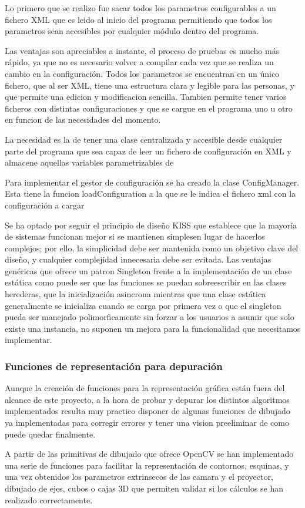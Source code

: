 Lo primero que se realizo fue sacar todos los parametros configurables a un fichero XML que es leido al inicio del programa permitiendo que todos los parametros sean accesibles por cualquier módulo dentro del programa.

Las ventajas son apreciables a instante, el proceso de pruebas es mucho más rápido, ya que no es necesario volver a compilar cada vez que se realiza un cambio en la configuración. Todos los parametros se encuentran en un único fichero, que al ser XML, tiene una estructura clara y legible para las personas, y que permite una edicion y modificacion sencilla. Tambien permite tener varios ficheros con distintas configuraciones y que se cargue en el programa uno u otro en funcion de las necesidades del momento.
 
La necesidad es la de tener una clase centralizada y accesible desde cualquier parte del programa que sea capaz de leer un fichero de configuración en XML y almacene aquellas variables parametrizables de

Para implementar el gestor de configuración se ha creado la clase ConfigManager. Esta tiene la funcion loadConfiguration a la que se le indica el fichero xml con la configuración a cargar 

Se ha optado por seguir el principio de diseño KISS que establece que la mayoría de sistemas funcionan mejor si se mantienen simplesen lugar de hacerlos complejos; por ello, la simplicidad debe ser mantenida como un objetivo clave del diseño, y cualquier complejidad innecesaria debe ser evitada. Las ventajas genéricas que ofrece un patron Singleton frente a la implementación de un clase estática como puede ser que las funciones se puedan sobreescribir en las clases herederas, que la inicialización asincrona mientras que una clase estática generalmente se inicializa cuando se carga por primera vez o que el singleton pueda ser manejado polimorficamente sin forzar a los usuarios a asumir que solo existe una instancia, no suponen un mejora para la funcionalidad que necesitamos implementar. 

\subsubsection{Funciones de representación para depuración}
Aunque la creación de funciones para la representación gráfica están fuera del alcance de este proyecto, a la hora de probar y depurar los distintos algoritmos implementados resulta muy practico disponer de algunas funciones de dibujado ya implementadas para corregir errores y tener una vision preeliminar de como puede quedar finalmente.

A partir de las primitivas de dibujado que ofrece OpenCV se han implementado una serie de funciones para facilitar la representación de contornos, esquinas, y una vez obtenidos los parametros extrinsecos de las camara y el proyector, dibujado de ejes, cubos o cajas 3D que permiten validar si los cálculos se han realizado correctamente.


